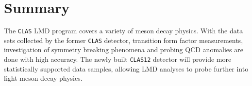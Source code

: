 \documentclass[epj]{webofc}
\begin{document}
\section{Summary}
The \textsc{\texttt{CLAS}} LMD program covers a variety of meson decay physics. With the data sets collected by the former \textsc{\texttt{CLAS}} detector, transition form factor measurements, investigation of symmetry breaking phenomena and probing QCD anomalies are done with high accuracy.
The newly built \textsc{\texttt{CLAS12}} detector will provide more statistically supported data samples, allowing LMD analyses to probe further into light meson decay physics.

%

%
%
%
%
%
%
%
%
%
%
\end{document}
